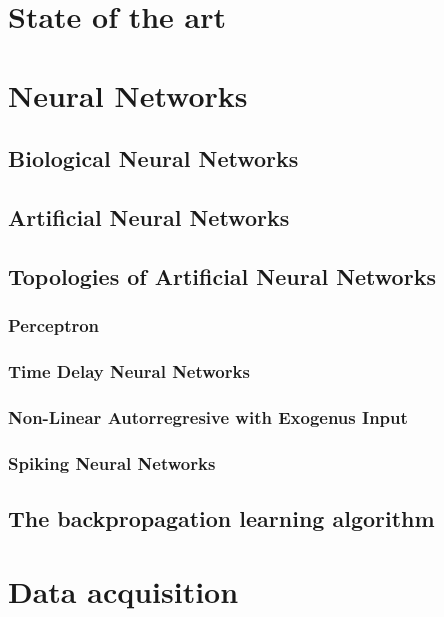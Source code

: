 \documentclass[a4paper,10pt,english]{report} %
\begin{document}
\chapter{State of the art}


\chapter{Neural Networks}

\section{Biological Neural Networks}

\section{Artificial Neural Networks}

\section{Topologies of Artificial Neural Networks}

	\subsection{Perceptron}
	
	\subsection{Time Delay Neural Networks}
	
	\subsection{Non-Linear Autorregresive with Exogenus Input}
	
	\subsection{Spiking Neural Networks}
	
\section{The backpropagation learning algorithm}


\chapter{Data acquisition}

\end{document}
